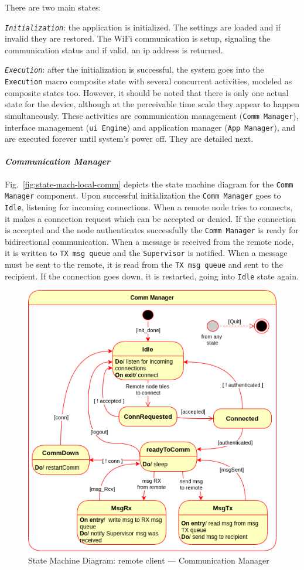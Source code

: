 There are two main states:
\begin{item-c}
\item \emph{\texttt{Initialization}}: the application is initialized. The
  settings are loaded and if invalid they are restored. The WiFi communication
  is setup, signaling the communication status and if valid, an \gls{ip} address
  is returned.
\item \emph{\texttt{Execution}}: after the initialization is successful, the system goes into the \texttt{Execution} macro composite state with several concurrent activities, modeled as composite states too. However, it should be noted that there is only one actual state for the device, although at the perceivable time scale they appear to happen simultaneously. These activities are communication management (\texttt{Comm Manager}), interface management (\texttt{\gls{ui} Engine}) and application manager (\texttt{App Manager}), and are executed forever until system's power off. They are detailed next.
\end{item-c}
%
\paragraph{\emph{Communication Manager}}
Fig.~\ref{fig:state-mach-local-comm} depicts the state machine diagram for the
\texttt{Comm Manager} component. Upon successful initialization the
\texttt{Comm Manager} goes to \texttt{Idle}, listening for incoming
connections. When a remote node tries to connects, it makes a connection request
which can be accepted or denied. If the connection is accepted and the node
authenticates successfully the \texttt{Comm Manager} is ready for bidirectional
communication. When a message is received from the remote node, it is written to
\texttt{TX msg queue} and the \texttt{Supervisor} is notified. When a message
must be sent to the remote, it is read from the \texttt{TX msg queue} and sent
to the recipient. If the connection goes down, it is restarted, going into
\texttt{Idle} state again.

\begin{figure}[htb!]
\centering
    \includegraphics[width=0.5\columnwidth]{./img/state-mach-rc-comm.png}
  \caption{State Machine Diagram: remote client --- Communication Manager}%
\label{fig:state-mach-rc-comm}
\end{figure}
%

